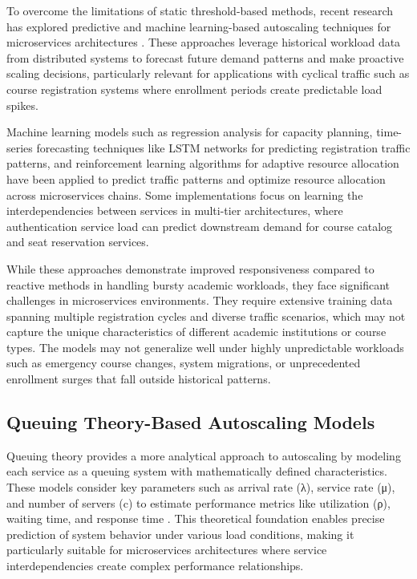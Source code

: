 To overcome the limitations of static threshold-based methods, recent research has explored predictive and machine learning-based autoscaling techniques for microservices architectures \cite{wang2024}. These approaches leverage historical workload data from distributed systems to forecast future demand patterns and make proactive scaling decisions, particularly relevant for applications with cyclical traffic such as course registration systems where enrollment periods create predictable load spikes.

Machine learning models such as regression analysis for capacity planning, time-series forecasting techniques like LSTM networks for predicting registration traffic patterns, and reinforcement learning algorithms for adaptive resource allocation have been applied to predict traffic patterns and optimize resource allocation across microservices chains. Some implementations focus on learning the interdependencies between services in multi-tier architectures, where authentication service load can predict downstream demand for course catalog and seat reservation services.

While these approaches demonstrate improved responsiveness compared to reactive methods in handling bursty academic workloads, they face significant challenges in microservices environments. They require extensive training data spanning multiple registration cycles and diverse traffic scenarios, which may not capture the unique characteristics of different academic institutions or course types. The models may not generalize well under highly unpredictable workloads such as emergency course changes, system migrations, or unprecedented enrollment surges that fall outside historical patterns.

\subsection{Queuing Theory-Based Autoscaling Models}

Queuing theory provides a more analytical approach to autoscaling by modeling each service as a queuing system with mathematically defined characteristics. These models consider key parameters such as arrival rate (λ), service rate (μ), and number of servers (c) to estimate performance metrics like utilization (ρ), waiting time, and response time \cite{lai2025}. This theoretical foundation enables precise prediction of system behavior under various load conditions, making it particularly suitable for microservices architectures where service interdependencies create complex performance relationships.


